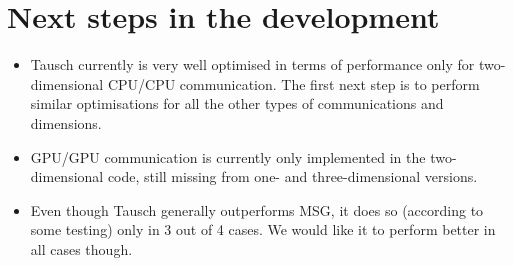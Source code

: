 \documentclass{article}
\begin{document}
\section{Next steps in the development}

\begin{itemize}
    \item Tausch currently is very well optimised in terms of performance only for two-dimensional CPU/CPU communication. The first next step is to perform similar optimisations for all the other types of communications and dimensions.
    \item GPU/GPU communication is currently only implemented in the two-dimensional code, still missing from one- and three-dimensional versions.
    \item Even though Tausch generally outperforms MSG, it does so (according to some testing) only in 3 out of 4 cases. We would like it to perform better in all cases though.
\end{itemize}
\end{document}
